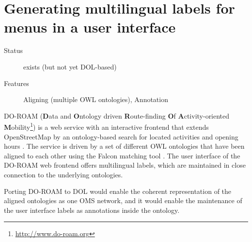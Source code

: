 \documentclass[10pt,fleqn,%
\ifpretendfinal
final%
\else
draft%
\fi,
]{scrreprt}
\newcommand{\sclause}[1]{\section{#1}}
\begin{document}
\newenvironment{usecase}[3]{\sclause{#1}%
\begin{description}
\item[Status] #2
\item[Features] #3
\end{description}
}{}
\begin{usecase}{Generating multilingual labels for menus in a user interface}{exists (but not yet DOL-based)}{Aligning (multiple OWL ontologies), Annotation}
  DO-ROAM (\textbf{D}ata and \textbf{O}ntology driven \textbf{R}oute-finding \textbf{O}f \textbf{A}ctivity-oriented \textbf{M}obility\footnote{\url{http://www.do-roam.org}}) is a web service with an interactive frontend that extends OpenStreetMap by an ontology-based search for located activities and opening hours \cite{do-roam}.  The service is driven by a set of different OWL ontologies that have been aligned to each other using the Falcon matching tool \cite{HuQu-08}.  The user interface of the DO-ROAM web frontend offers multilingual labels, which are maintained in close connection to the underlying ontologies.

  Porting DO-ROAM to DOL would enable the coherent representation of the aligned ontologies as one OMS network, and it would enable  the maintenance of the user interface labels as annotations inside the ontology.
\end{usecase}
\end{document}
